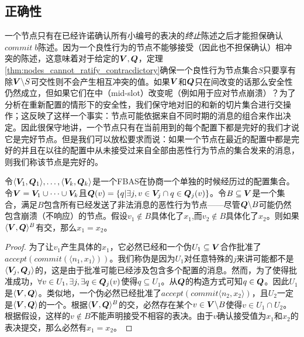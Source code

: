 \subsection{正确性}\label{sec:scp_correct}

一个节点只有在已经许诺确认所有小编号的表决的\textit{终止}陈述之后才能担保确认$commit\;b$陈述。因为一个良性行为的节点不能够接受（因此也不担保确认）相冲突的陈述，这意味着对于给定的${\bm V},{\bm Q}$，定理\ref{thm:nodes_cannot_ratify_contracdictory}确保一个良性行为节点集合$S$只要享有除${\bm V}\backslash S${\quorum}可交性则不会产生相互冲突的值。如果${\bm V}$和${\bm Q}$只在{\slot}间改变的话那么安全性仍然成立，但如果它们在{\slot}中（mid-slot）改变呢（例如用于应对节点崩溃）？为了分析在重新配置的情形下的安全性，我们保守地对旧的和新的{\quorum}切片集合进行交操作；这反映了这样一个事实：节点可能依据来自不同时期的消息的组合来作出决定。因此很保守地讲，一个节点只有在当前{\slot}用到的每个配置下都是完好的我们才说它是完好节点。但是我们可以放松要求而说：如果一个节点在最近的配置中都是完好的并且在以往的配置中从未接受过来自全部由恶性行为节点的{\vblock}集合发来的消息，则我们称该节点是完好的。

\begin{theorem}\label{th12}
        令$\langle {\bm V_1},{\bm Q_1}\rangle,\ldots,\langle {\bm V_k},{\bm Q_k}\rangle$是一个FBAS在协商一个单独{\slot}的时候经历过的配置集合。令${\bm V}={\bm V_1}\cup \cdots\cup {\bm V_k}$且${\bm Q}(v)=\left\{q|\exists j, v\in{\bm V_j}\cap q\in{\bm Q}_j(v)\right\}$。令$B\subseteq{\bm V}$是一个集合，满足$B$包含所有已经发送了非法消息的恶性行为节点——尽管${\bm Q}\backslash B$可能仍然包含崩溃（不响应）的节点。假设$v_1\not\in B$具体化了$x_1$,而$v_2\not\in B$具体化了$x_2$。则如果$\langle{\bm V},{\bm Q}\rangle^{B}$有{\quorum}交，那么$x_1=x_2$。
\end{theorem}

\begin{proof}
        为了让$v_1$产生具体的$x_1$，它必然已经和一个伪{\quorum}$U_1\subseteq{\bm V}$合作批准了$accept(commit(\langle n_1,x_1\rangle))$。我们称伪{\quorum}是因为$U_1$对任意特殊的$j$来讲可能都不是$\langle{\bm V}_j,{\bm Q}_j\rangle$的{\quorum}，这是由于批准可能已经涉及包含多个配置的消息。然而，为了使得批准成功，$\forall v\in U_1,\exists j, \exists q\in{\bm Q}_j(v)$使得$q\subseteq U_1$。从${\bm Q}$的构造方式可知$q\in{\bm Q}$。因此$U_1$是$\langle{\bm V},{\bm Q}\rangle$。类似地，一个伪{\quorum}必然已经批准了$accept(commit\langle n_2,x_2\rangle)$，且$U_2$一定是$\langle{\bm V},{\bm Q}\rangle$的一个{\quorum}。根据$\langle{\bm V},{\bm Q}\rangle^{B}$的{\quorum}交，必然存在某个$v\in {\bm V}\backslash B$使得$v\in U_1\cap U_2$。根据假设，这样的$v\not\in B$不能声明接受不相容的表决。由于$v$确认接受值为$x_1$和$x_2$的表决提交，那么必然有$x_1=x_2$。
\end{proof}

